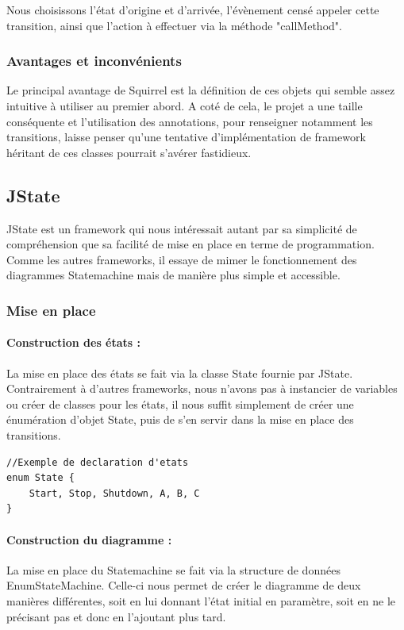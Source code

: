 \documentclass[french, 12pt, a4paper]{article}
\begin{document}
            Nous choisissons l'état d'origine et d'arrivée, l'évènement censé appeler cette transition, ainsi que l'action à effectuer via la méthode "callMethod".
            
            
        \subsubsection{Avantages et inconvénients}
        Le principal avantage de Squirrel est la définition de ces objets qui semble assez intuitive à utiliser au premier abord. A coté de cela, le projet a une taille conséquente et l'utilisation des annotations, pour renseigner notamment les transitions, laisse penser qu'une tentative d'implémentation de framework héritant de ces classes pourrait s'avérer fastidieux.

    \subsection{JState}
    JState est un framework qui nous intéressait autant par sa simplicité de compréhension que sa facilité de mise en place en terme de programmation. Comme les autres frameworks, il essaye de mimer le fonctionnement des diagrammes Statemachine mais de manière plus simple et accessible.
    
        \subsubsection{Mise en place}
            \paragraph{Construction des états : }
            La mise en place des états se fait via la classe State fournie par JState. Contrairement à d'autres frameworks, nous n'avons pas à instancier de variables ou créer de classes pour les états, il nous suffit simplement de créer une énumération d'objet State, puis de s'en servir dans la mise en place des transitions.
            
            \begin{lstlisting}
//Exemple de declaration d'etats
enum State {
    Start, Stop, Shutdown, A, B, C
}
            \end{lstlisting}
            
            \paragraph{Construction du diagramme : }
            La mise en place du Statemachine se fait via la structure de données EnumStateMachine. Celle-ci nous permet de créer le diagramme de deux manières différentes, soit en lui donnant l'état initial en paramètre, soit en ne le précisant pas et donc en l'ajoutant plus tard.
            
\end{document}
